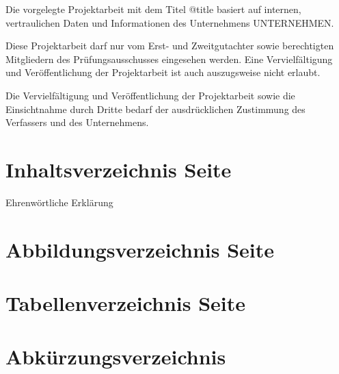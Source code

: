 \documentclass[a4paper, 11pt]{article}
\begin{document}
Die vorgelegte Projektarbeit mit dem Titel @title basiert auf internen, vertraulichen Daten und Informationen des Unternehmens UNTERNEHMEN.

Diese Projektarbeit darf nur vom Erst- und Zweitgutachter sowie berechtigten Mitgliedern des Prüfungsausschusses eingesehen werden.
Eine Vervielfältigung und Veröffentlichung der Projektarbeit ist auch auszugsweise nicht erlaubt.

Die Vervielfältigung und Veröffentlichung der Projektarbeit sowie die Einsichtnahme durch Dritte bedarf der ausdrücklichen
Zustimmung des Verfassers und des Unternehmens.
\newpage


\section*{Inhaltsverzeichnis \hfill Seite}
\pagestyle{sxoli1}
\renewcommand\contentsname{}
\tableofcontents
Ehrenwörtliche Erklärung
\newpage

\section*{Abbildungsverzeichnis \hfill Seite}
\renewcommand\listfigurename{}
\setlength{\cftfigindent}{0em}
\setlength{\cftfignumwidth}{6.5em}
\renewcommand{\cftfigpresnum}{Abbildung }
\listoffigures
\newpage

\section*{Tabellenverzeichnis \hfill Seite}
\renewcommand\listtablename{}
\setlength{\cfttabindent}{0em}
\setlength{\cfttabnumwidth}{5.5em}
\renewcommand{\cfttabpresnum}{Tabelle }
\listoftables
\newpage

\section*{Abkürzungsverzeichnis}
\begin{acronym}[*************]
 \end{acronym}
\newpage
\end{document}
